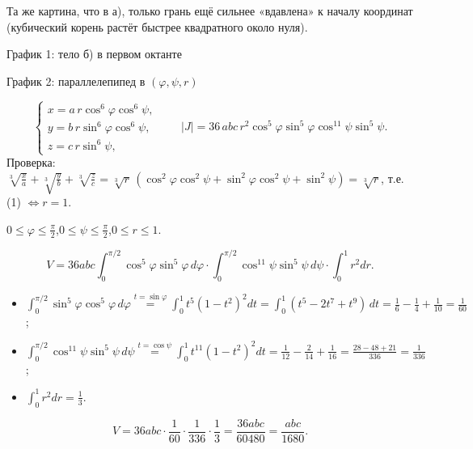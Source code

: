 Та же картина, что в а), только грань ещё сильнее «вдавлена» к началу координат (кубический корень растёт быстрее квадратного около нуля).

\begin{center}
\begin{minipage}[t]{0.49\linewidth}\centering
{}

\small График 1: тело б) в первом октанте
\end{minipage}\hfill
\begin{minipage}[t]{0.49\linewidth}\centering
{}

\small График 2: параллелепипед в $(\varphi,\psi,r)$
\end{minipage}
\end{center}

\[
\begin{cases}x=a\,r\cos^6\varphi\cos^6\psi,\\ y=b\,r\sin^6\varphi\cos^6\psi,\\ z=c\,r\sin^6\psi,\end{cases}
\qquad |J|=36\,abc\,r^2\cos^5\varphi\sin^5\varphi\cos^{11}\psi\sin^5\psi .
\]
Проверка: $\sqrt[3]{\frac xa}+\sqrt[3]{\frac yb}+\sqrt[3]{\frac zc}=\sqrt[3]r\,(\cos^2\varphi\cos^2\psi+\sin^2\varphi\cos^2\psi+\sin^2\psi)=\sqrt[3]r$, т.е. (1) $\iff r=1$.

$0\leqslant\varphi\leqslant\frac\pi2$,\quad $0\leqslant\psi\leqslant\frac\pi2$,\quad $0\leqslant r\leqslant1$.

\[
V=36abc\int_0^{\pi/2}\cos^5\varphi\sin^5\varphi\,d\varphi\cdot\int_0^{\pi/2}\cos^{11}\psi\sin^5\psi\,d\psi\cdot\int_0^1r^2dr .
\]
\begin{itemize}
\item $\displaystyle\int_0^{\pi/2}\sin^5\varphi\cos^5\varphi\,d\varphi\overset{t=\sin\varphi}{=}\int_0^1t^5(1-t^2)^2dt=\int_0^1(t^5-2t^7+t^9)\,dt=\frac16-\frac14+\frac1{10}=\frac1{60}$;
\item $\displaystyle\int_0^{\pi/2}\cos^{11}\psi\sin^5\psi\,d\psi\overset{t=\cos\psi}{=}\int_0^1t^{11}(1-t^2)^2dt=\frac1{12}-\frac2{14}+\frac1{16}=\frac{28-48+21}{336}=\frac1{336}$;
\item $\displaystyle\int_0^1r^2dr=\frac13$.
\end{itemize}
\[
V=36abc\cdot\frac1{60}\cdot\frac1{336}\cdot\frac13=\frac{36abc}{60480}=\frac{abc}{1680}.
\]

